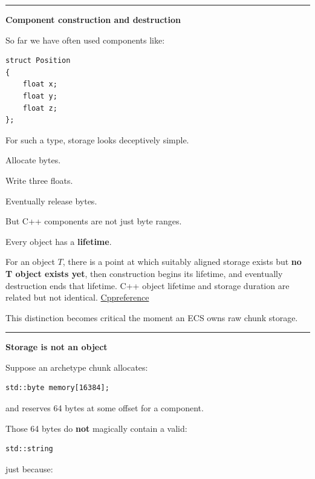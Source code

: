 \hypertarget{05-engine-i-ch017-production-component-lifetime-serialization-reflection-scenes-and-identity}{}

\begin{center}\rule{0.5\linewidth}{0.5pt}\end{center}

\textbf{Component construction and destruction}

So far we have often used components like:

\begin{verbatim}
struct Position
{
    float x;
    float y;
    float z;
};
\end{verbatim}

For such a type, storage looks deceptively simple.

Allocate bytes.

Write three floats.

Eventually release bytes.

But C++ components are not just byte ranges.

Every object has a \textbf{lifetime}.

For an object \(T\), there is a point at which suitably aligned storage exists but \textbf{no T object exists yet}, then construction begins its lifetime, and eventually destruction ends that lifetime. C++ object lifetime and storage duration are related but not identical. \href{https://en.cppreference.com/cpp/language/lifetime?utm_source=chatgpt.com}{Cppreference}

This distinction becomes critical the moment an ECS owns raw chunk storage.

\begin{center}\rule{0.5\linewidth}{0.5pt}\end{center}

\textbf{Storage is not an object}

Suppose an archetype chunk allocates:

\begin{verbatim}
std::byte memory[16384];
\end{verbatim}

and reserves 64 bytes at some offset for a component.

Those 64 bytes do \textbf{not} magically contain a valid:

\begin{verbatim}
std::string
\end{verbatim}

just because:

